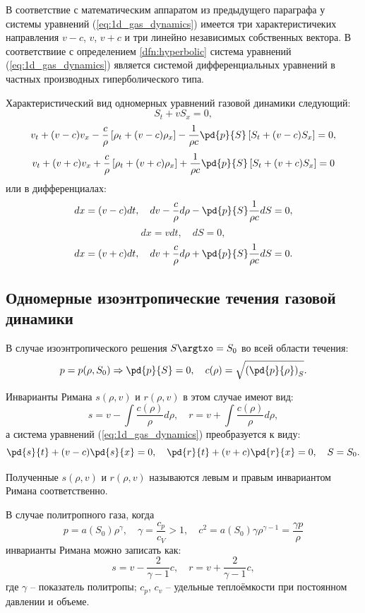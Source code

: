 \documentclass[14pt]{extarticle}
\begin{document}
В соответствие с математическим аппаратом из предыдущего параграфа у системы уравнений (\ref{eq:1d_gas_dynamics}) имеется три характеристичеких направления $v-c$, $v$, $v+c$ и три линейно независимых собственных вектора. В соответствиие с определением \ref{dfn:hyperbolic} система уравнений (\ref{eq:1d_gas_dynamics}) является системой дифференциальных уравнений в частных производных \alert{гиперболического типа}.

Характеристический вид одномерных уравнений газовой динамики следующий:
\[
S_t + v S_x = 0,
\]
\[
v_t + (v-c)v_x -
\frac{c}{\rho} \left[\rho_t + (v-c)\rho_x	\right]-
\frac{1}{\rho c} \pd{p}{S}\left[ S_t + (v-c) S_x \right] = 0,
\]
\[
v_t + (v+c)v_x +
\frac{c}{\rho} \left[\rho_t + (v+c)\rho_x	\right] +
\frac{1}{\rho c} \pd{p}{S}\left[ S_t + (v+c) S_x \right] = 0
\]
или в дифференциалах:
\[
	dx = (v-c) dt, \quad dv - \frac{c}{\rho} d\rho - \pd{p}{S}\frac{1}{\rho c} dS = 0,
\]
\[
	dx = v dt,\quad dS  = 0,
\]
\[
	dx = (v+c) dt, \quad dv + \frac{c}{\rho} d\rho + \pd{p}{S}\frac{1}{\rho c} dS = 0.
\]

\subsection{Одномерные изоэнтропические течения газовой динамики}

В случае изоэнтропического решения  $S\argtxo = S_0$ во всей области течения: 
\[
	p = p(\rho, S_0) \Rightarrow \pd{p}{S} = 0, \quad c(\rho) = \sqrt{\left(\pd{p}{\rho}\right)_S}.
\]
		
		
Инварианты Римана $s(\rho,v)$ и $r(\rho,v)$ в этом случае имеют вид:
\[
s = v - \int\frac{c(\rho)}{\rho} d\rho,\quad
r = v + \int\frac{c(\rho)}{\rho} d\rho,
\]
а система уравнений (\ref{eq:1d_gas_dynamics}) преобразуется к виду:			
\[
\pd{s}{t} + (v-c) \pd{s}{x} = 0,\quad \pd{r}{t} + (v+c) \pd{r}{x} = 0, \quad S=S_0.
\]

Полученные $s(\rho,v)$ и $r(\rho,v)$ называются левым и правым инвариантом Римана соответственно.
			


В случае политропного газа, когда
\begin{equation}
	\label{eq:polytrop_dfn}
	p = a(S_0) \rho^\gamma,\quad \gamma = \frac{c_p}{c_V} > 1,\quad
	c^2 = a(S_0)\gamma \rho^{\gamma-1} = \frac{\gamma p}{\rho}
\end{equation}
инварианты Римана можно записать как:
\[
	s =  
	v- \frac{2}{\gamma-1}c,\quad
	r = 
	v + \frac{2}{\gamma-1}c,
\]
где $\gamma$ -- показатель политропы; $c_p$, $c_v$ -- удельные теплоёмкости при постоянном давлении и объеме.
	
\end{document}
